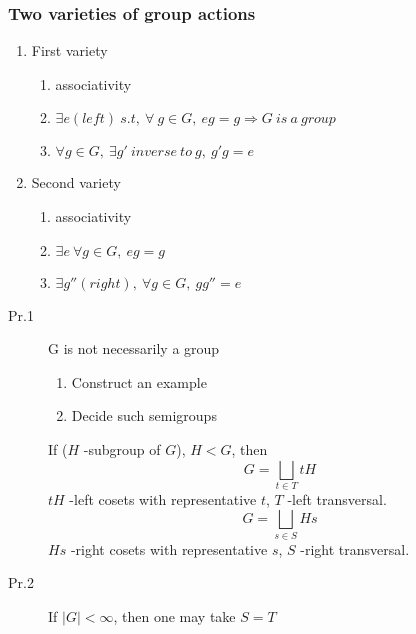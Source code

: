 \documentclass[12pt, a4paper]{article}
\theoremstyle{definition}
\begin{document}
\subsubsection{Two varieties of group actions}
\begin{enumerate}[label=\Roman*.]
    \item First variety
    \begin{enumerate}[label= (\arabic*)]
        \item associativity
        \item $\exists e(left)\ s.t,\  \forall \ g \in G,\ eg=g \Rightarrow 
            G\ is\ a\ group \ $
        \item $\forall g \in G,\ \exists g'\ inverse\ to\ g,\ g'g=e  $
    \end{enumerate}
    \item Second variety
    \begin{enumerate}[label= (\arabic*)]
        \item associativity
        \item $\exists e\ \forall g\in G,\ eg=g $
        \item $\exists g''(right),\ \forall g\in  G,\ gg''=e$
    \end{enumerate}
\end{enumerate}
\begin{description}
    \item[Pr.1] G is not necessarily a group
    \begin{enumerate}
        \item Construct an example
        \item Decide such semigroups
    \end{enumerate}
\par
If ($H$ -subgroup of $G$), $H<G$, then
\[ G=\bigsqcup _{t\in T} tH \] 
$tH$ -left cosets with representative $t$, $T$ -left transversal.
\[G = \bigsqcup_{s\in S}Hs\] 
$Hs$ -right cosets with representative $s$, $S$ -right transversal.
\end{description}
\begin{description}
    \item[Pr.2] If $|G|< \infty $, then one may take $S = T$
\end{description}
\end{document}

